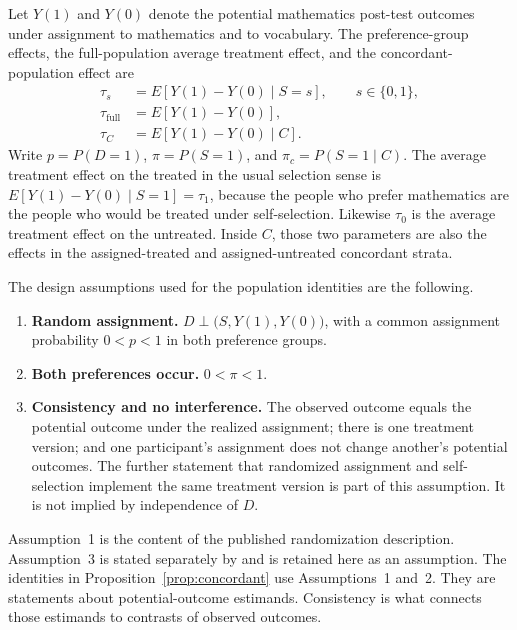 \documentclass[11pt]{article}
\theoremstyle{remark}
\begin{document}
Let $Y(1)$ and $Y(0)$ denote the potential mathematics post-test outcomes under assignment to mathematics and to vocabulary. The preference-group effects, the full-population average treatment effect, and the concordant-population effect are
\begin{align*}
\tau_s &= E[Y(1)-Y(0)\mid S=s], \qquad s\in\{0,1\},\\
\tau_{\mathrm{full}} &= E[Y(1)-Y(0)],\\
\tau_C &= E[Y(1)-Y(0)\mid C].
\end{align*}
Write $p=P(D=1)$, $\pi=P(S=1)$, and $\pi_c=P(S=1\mid C)$. The average treatment effect on the treated in the usual selection sense is $E[Y(1)-Y(0)\mid S=1]=\tau_1$, because the people who prefer mathematics are the people who would be treated under self-selection. Likewise $\tau_0$ is the average treatment effect on the untreated. Inside $C$, those two parameters are also the effects in the assigned-treated and assigned-untreated concordant strata.

The design assumptions used for the population identities are the following.

\begin{enumerate}
\item \textbf{Random assignment.} $D\perp\bigl(S,Y(1),Y(0)\bigr)$, with a common assignment probability $0<p<1$ in both preference groups.
\item \textbf{Both preferences occur.} $0<\pi<1$.
\item \textbf{Consistency and no interference.} The observed outcome equals the potential outcome under the realized assignment; there is one treatment version; and one participant's assignment does not change another's potential outcomes. The further statement that randomized assignment and self-selection implement the same treatment version is part of this assumption. It is not implied by independence of $D$.
\end{enumerate}

Assumption~1 is the content of the published randomization description. Assumption~3 is stated separately by \citet{keller2025} and is retained here as an assumption. The identities in Proposition~\ref{prop:concordant} use Assumptions~1 and~2. They are statements about potential-outcome estimands. Consistency is what connects those estimands to contrasts of observed outcomes.
\end{document}
